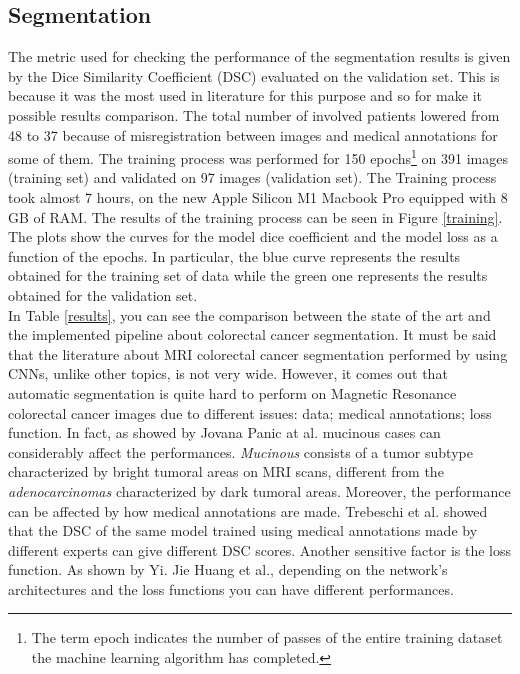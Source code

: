 \documentclass{standalone}
\begin{document}
\subsection{Segmentation}

The metric used for checking the performance of the segmentation results is given by the Dice Similarity Coefficient (DSC) evaluated on the validation set.
This is because it was the most used in literature for this purpose and so for make it possible results comparison.
The total number of involved patients lowered from 48 to 37 because of misregistration between images and medical annotations for some of them.
The training process was performed for 150 epochs\footnote{The term epoch indicates the number of passes of the entire training dataset the machine learning algorithm has completed.} on 391 images (training set) and validated on 97 images (validation set).
The Training process took almost 7 hours, on the new Apple Silicon M1 Macbook Pro equipped with 8 GB of RAM.
The results of the training process can be seen in Figure \ref{training}.
The plots show the curves for the model dice coefficient and the model loss as a function of the epochs.
In particular, the blue curve represents the results obtained for the training set of data while the green one represents the results obtained for the validation set.
\\
In Table \ref{results}, you can see the comparison between the state of the art and the implemented pipeline about colorectal cancer segmentation.
It must be said that the literature about MRI colorectal cancer segmentation performed by using CNNs, unlike other topics, is not very wide.
However, it comes out that automatic segmentation is quite hard to perform on Magnetic Resonance colorectal cancer images due to different issues: data; medical annotations; loss function.
In fact, as showed by Jovana Panic at al.\cite{jpanic} mucinous cases can considerably affect the performances.
\textit{Mucinous} consists of a tumor subtype characterized by bright tumoral areas on MRI scans, different from the \textit{adenocarcinomas} characterized by dark tumoral areas.
Moreover, the performance can be affected by how medical annotations are made.
Trebeschi et al. \cite{Trebeschi2017} showed that the DSC of the same model trained using medical annotations made by different experts can give different DSC scores.
Another sensitive factor is the loss function. 
As shown by Yi. Jie Huang et al.\cite{YiJieHuang}, depending on the network's architectures and the loss functions you can have different performances. 
 
\end{document}
